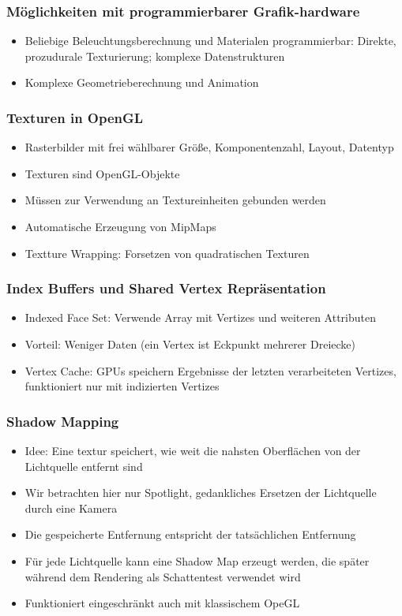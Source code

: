 \subsubsection{Möglichkeiten mit programmierbarer Grafik-hardware}
\begin{itemize}
	\item Beliebige Beleuchtungsberechnung und Materialen programmierbar: Direkte, prozudurale Texturierung; komplexe Datenstrukturen
	\item Komplexe Geometrieberechnung und Animation
\end{itemize}

\subsubsection{Texturen in OpenGL}
\begin{itemize}
	\item Rasterbilder mit frei wählbarer Größe, Komponentenzahl, Layout, Datentyp
	\item Texturen sind OpenGL-Objekte
	\item Müssen zur Verwendung an Textureinheiten gebunden werden
	\item Automatische Erzeugung von MipMaps
	\item Textture Wrapping: Forsetzen von quadratischen Texturen
\end{itemize}

\subsubsection{Index Buffers und Shared Vertex Repräsentation}
\begin{itemize}
	\item Indexed Face Set: Verwende Array mit Vertizes und weiteren Attributen
	\item Vorteil: Weniger Daten (ein Vertex ist Eckpunkt mehrerer Dreiecke)
	\item Vertex Cache: GPUs speichern Ergebnisse der letzten verarbeiteten Vertizes, funktioniert nur mit indizierten Vertizes
\end{itemize}

\subsubsection{Shadow Mapping}
\begin{itemize}
	\item Idee: Eine textur speichert, wie weit die nahsten Oberflächen von der Lichtquelle entfernt sind
	\item Wir betrachten hier nur Spotlight, gedankliches Ersetzen der Lichtquelle durch eine Kamera
	\item Die gespeicherte Entfernung entspricht der tatsächlichen Entfernung
	\item Für jede Lichtquelle kann eine Shadow Map erzeugt werden, die später während dem Rendering als Schattentest verwendet wird
	\item Funktioniert eingeschränkt auch mit klassischem OpeGL
\end{itemize}


